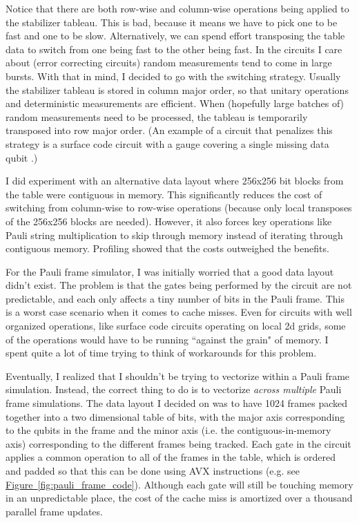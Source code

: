 \documentclass[onecolumn,unpublished]{quantumarticle}
\theoremstyle{definition}
\theoremstyle{definition}
\theoremstyle{definition}
\newcommand{\fig}[1]{\hyperref[fig:#1]{Figure~\ref*{fig:#1}}}
\begin{document}
Notice that there are both row-wise and column-wise operations being applied to the stabilizer tableau.
This is bad, because it means we have to pick one to be fast and one to be slow.
Alternatively, we can spend effort transposing the table data to switch from one being fast to the other being fast.
In the circuits I care about (error correcting circuits) random measurements tend to come in large bursts.
With that in mind, I decided to go with the switching strategy.
Usually the stabilizer tableau is stored in column major order, so that unitary operations and deterministic measurements are efficient.
When (hopefully large batches of) random measurements need to be processed, the tableau is temporarily transposed into row major order.
(An example of a circuit that penalizes this strategy is a surface code circuit with a gauge covering a single missing data qubit \cite{nagayama2017surfacegauge}.)

I did experiment with an alternative data layout where 256x256 bit blocks from the table were contiguous in memory.
This significantly reduces the cost of switching from column-wise to row-wise operations (because only local transposes of the 256x256 blocks are needed).
However, it also forces key operations like Pauli string multiplication to skip through memory instead of iterating through contiguous memory.
Profiling showed that the costs outweighed the benefits.

For the Pauli frame simulator, I was initially worried that a good data layout didn't exist.
The problem is that the gates being performed by the circuit are not predictable, and each only affects a tiny number of bits in the Pauli frame.
This is a worst case scenario when it comes to cache misses.
Even for circuits with well organized operations, like surface code circuits operating on local 2d grids, some of the operations would have to be running ``against the grain" of memory.
I spent quite a lot of time trying to think of workarounds for this problem.

Eventually, I realized that I shouldn't be trying to vectorize within a Pauli frame simulation.
Instead, the correct thing to do is to vectorize {\em across multiple} Pauli frame simulations.
The data layout I decided on was to have 1024 frames packed together into a two dimensional table of bits, with the major axis corresponding to the qubits in the frame and the minor axis (i.e. the contiguous-in-memory axis) corresponding to the different frames being tracked.
Each gate in the circuit applies a common operation to all of the frames in the table, which is ordered and padded so that this can be done using AVX instructions (e.g. see \fig{pauli_frame_code}).
Although each gate will still be touching memory in an unpredictable place, the cost of the cache miss is amortized over a thousand parallel frame updates.
\end{document}
